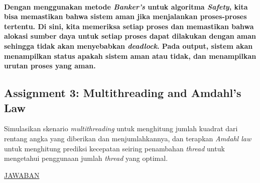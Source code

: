 \documentclass[12pt]{article}
\begin{document}
\paragraph{
    \hspace*{1cm} Dengan menggunakan metode \textit{Banker's} untuk algoritma \textit{Safety}, kita bisa memastikan bahwa sistem aman jika menjalankan proses-proses tertentu. Di sini, kita memeriksa setiap proses dan memastikan bahwa alokasi sumber daya untuk setiap proses dapat dilakukan dengan aman sehingga tidak akan menyebabkan \textit{deadlock}. Pada output, sistem akan menampilkan status apakah sistem aman atau tidak, dan menampilkan urutan proses yang aman.
}


\subsection{Assignment 3: Multithreading and Amdahl's Law}
\hspace*{1cm} Simulasikan skenario \textit{multithreading} untuk menghitung jumlah kuadrat dari rentang angka yang diberikan dan menjumlahkannya, dan terapkan \textit{Amdahl law} untuk menghitung prediksi kecepatan seiring penambahan \textit{thread} untuk mengetahui penggunaan jumlah \textit{thread} yang optimal.
\newline
\newline

\begin{center}
    \underline{JAWABAN}
\end{center}
\end{document}
